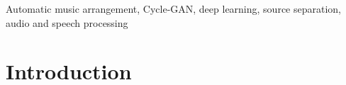\documentclass[journal]{IEEEtran}
\begin{document}
\begin{IEEEkeywords}
Automatic music arrangement, Cycle-GAN, deep learning, source separation, audio and speech processing
\end{IEEEkeywords}






%
\IEEEpeerreviewmaketitle



\section{Introduction}
% 
% 
% 
% 
\end{document}
